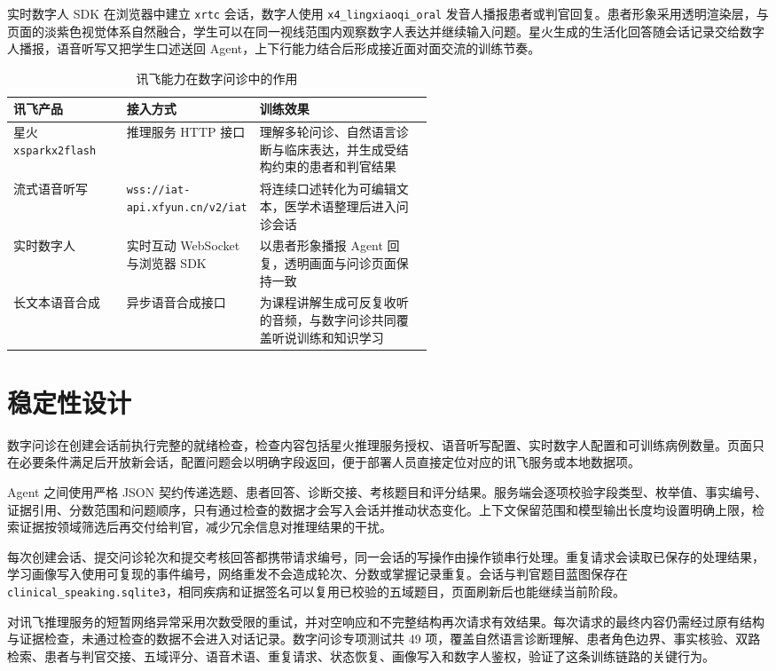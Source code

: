 实时数字人 SDK 在浏览器中建立 \texttt{xrtc} 会话，数字人使用 \texttt{x4\_lingxiaoqi\_oral} 发音人播报患者或判官回复。患者形象采用透明渲染层，与页面的淡紫色视觉体系自然融合，学生可以在同一视线范围内观察数字人表达并继续输入问题。星火生成的生活化回答随会话记录交给数字人播报，语音听写又把学生口述送回 Agent，上下行能力结合后形成接近面对面交流的训练节奏。

\begin{table}[H]
  \centering
  \caption{讯飞能力在数字问诊中的作用}
  \label{tab:clinical-xfyun-capabilities}
  \begin{tabularx}{\linewidth}{p{0.27\linewidth}p{0.28\linewidth}X}
    \toprule
    讯飞产品 & 接入方式 & 训练效果 \\
    \midrule
    星火 \texttt{xsparkx2flash} & 推理服务 HTTP 接口 & 理解多轮问诊、自然语言诊断与临床表达，并生成受结构约束的患者和判官结果 \\
    流式语音听写 & \texttt{wss://iat-api.xfyun.cn/v2/iat} & 将连续口述转化为可编辑文本，医学术语整理后进入问诊会话 \\
    实时数字人 & 实时互动 WebSocket 与浏览器 SDK & 以患者形象播报 Agent 回复，透明画面与问诊页面保持一致 \\
    长文本语音合成 & 异步语音合成接口 & 为课程讲解生成可反复收听的音频，与数字问诊共同覆盖听说训练和知识学习 \\
    \bottomrule
  \end{tabularx}
\end{table}

\section{稳定性设计}

数字问诊在创建会话前执行完整的就绪检查，检查内容包括星火推理服务授权、语音听写配置、实时数字人配置和可训练病例数量。页面只在必要条件满足后开放新会话，配置问题会以明确字段返回，便于部署人员直接定位对应的讯飞服务或本地数据项。

Agent 之间使用严格 JSON 契约传递选题、患者回答、诊断交接、考核题目和评分结果。服务端会逐项校验字段类型、枚举值、事实编号、证据引用、分数范围和问题顺序，只有通过检查的数据才会写入会话并推动状态变化。上下文保留范围和模型输出长度均设置明确上限，检索证据按领域筛选后再交付给判官，减少冗余信息对推理结果的干扰。

每次创建会话、提交问诊轮次和提交考核回答都携带请求编号，同一会话的写操作由操作锁串行处理。重复请求会读取已保存的处理结果，学习画像写入使用可复现的事件编号，网络重发不会造成轮次、分数或掌握记录重复。会话与判官题目蓝图保存在 \texttt{clinical\_speaking.sqlite3}，相同疾病和证据签名可以复用已校验的五域题目，页面刷新后也能继续当前阶段。

对讯飞推理服务的短暂网络异常采用次数受限的重试，并对空响应和不完整结构再次请求有效结果。每次请求的最终内容仍需经过原有结构与证据检查，未通过检查的数据不会进入对话记录。数字问诊专项测试共 49 项，覆盖自然语言诊断理解、患者角色边界、事实核验、双路检索、患者与判官交接、五域评分、语音术语、重复请求、状态恢复、画像写入和数字人鉴权，验证了这条训练链路的关键行为。
